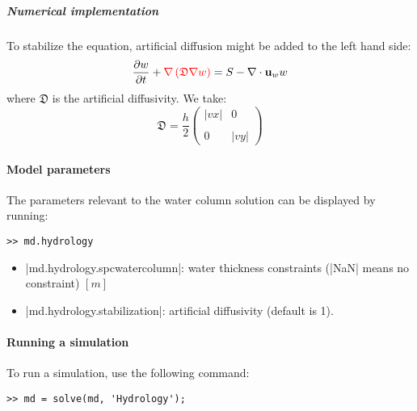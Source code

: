\subparagraph{Numerical implementation}
To stabilize the equation, artificial diffusion might be added to the left hand side:
\begin{equation}
	\frac{\partial w}{\partial t} +{\color{red} \nabla \left(\mathfrak{D} \nabla w\right)} =S - \nabla \cdot {\bf u}_w w
\end{equation}
where $\mathfrak{D}$ is the artificial diffusivity. We take:
\begin{equation}
	\mathfrak{D} = \frac{h}{2}
	\left(\begin{array}{cc}
		\left|vx\right| & 0 \\
		\\
		0 & \left|vy\right|
	\end{array}\right)
\end{equation}

\paragraph{Model parameters}
The parameters relevant to the water column solution can be displayed by running:
\begin{lstlisting}
>> md.hydrology
\end{lstlisting}

\begin{itemize}
	\item \lstinlinebg|md.hydrology.spcwatercolumn|: water thickness constraints (\lstinlinebg|NaN| means no constraint) $[m]$
	\item \lstinlinebg|md.hydrology.stabilization|: artificial diffusivity (default is 1).
\end{itemize}

\paragraph{Running a simulation}
To run a simulation, use the following command:
\begin{lstlisting}
>> md = solve(md, 'Hydrology');
\end{lstlisting}

\clearpage %
